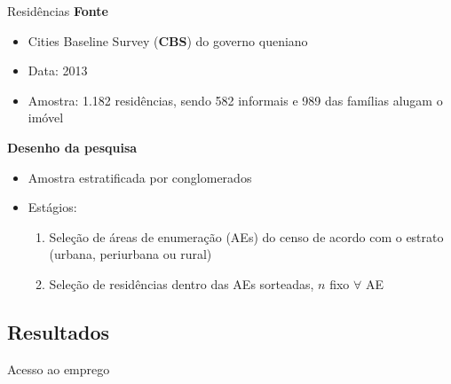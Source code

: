 \documentclass[
  ignorenonframetext,
  aspectratio=169]{beamer}
\providecommand{\tightlist}{%
  \setlength{\itemsep}{0pt}\setlength{\parskip}{0pt}}
\begin{document}
\begin{frame}{Residências}
\protect\hypertarget{residuxeancias}{}
\textbf{Fonte}

\begin{itemize}
\tightlist
\item
  Cities Baseline Survey (\textbf{CBS}) do governo queniano
\item
  Data: 2013
\item
  Amostra: 1.182 residências, sendo 582 informais e 989 das famílias
  alugam o imóvel
\end{itemize}

\textbf{Desenho da pesquisa}

\begin{itemize}
\tightlist
\item
  Amostra estratificada por conglomerados
\item
  Estágios:

  \begin{enumerate}
  \tightlist
  \item
    Seleção de áreas de enumeração (AEs) do censo de acordo com o
    estrato (urbana, periurbana ou rural)
  \item
    Seleção de residências dentro das AEs sorteadas, \(n\) fixo
    \(\forall\) AE
  \end{enumerate}
\end{itemize}
\end{frame}

\hypertarget{resultados}{%
\subsection{Resultados}\label{resultados}}

\begin{frame}{Acesso ao emprego}
\protect\hypertarget{acesso-ao-emprego}{}
\end{frame}
\end{document}
